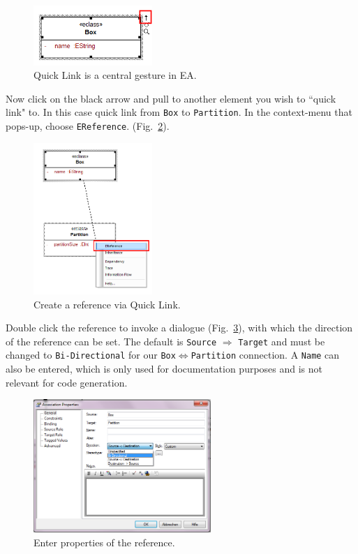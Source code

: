 \begin{figure}[htbp]
	\centering
  \includegraphics[width=0.4\textwidth]{pics/memBoxBilder/memBox23.png}
	\caption{Quick Link is a central gesture in EA.} 
	\label{fig:quicklink}
\end{figure}

\clearpage 

Now click on the black arrow and pull to another element you wish to ``quick
link" to.  In this case quick link from \texttt{Box} to \texttt{Partition}.  In
the context-menu that pops-up, choose \texttt{EReference}.
(Fig.~\ref{fig:ereference}). 

\begin{figure}[htbp] 
	\centering
  \includegraphics[width=0.4\textwidth]{pics/memBoxBilder/memBox24.png}
	\caption{Create a reference via Quick Link.}
	\label{fig:ereference}
\end{figure}

Double click the reference to invoke a dialogue (Fig.~\ref{fig:ereference_properties}), with which the
direction of the reference can be set.  The default is \texttt{Source} $\Rightarrow$ \texttt{Target} and must be changed to \texttt{Bi-Directional} for our \texttt{Box}$\Leftrightarrow$\texttt{Partition} connection.
A \texttt{Name} can also be entered, which is only used for documentation
purposes and is not relevant for code generation.

\begin{figure}[htbp]
	\centering
  \includegraphics[width=0.6\textwidth]{pics/memBoxBilder/memBox25.png}
	\caption{Enter properties of the reference.}
	\label{fig:ereference_properties}
\end{figure}
	
